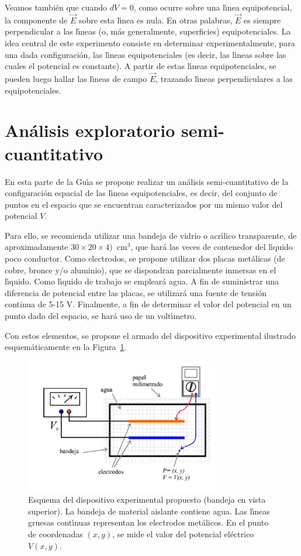 \documentclass[laboratorio]{guia}
\begin{document}
Veamos tambi\'en que cuando $dV=0$, como ocurre sobre una l\'\i nea
equipotencial, la componente de $\vec{E}$ sobre esta l\'\i nea es nula. En
otras palabras, $\vec{E}$ es siempre perpendicular a las l\'\i neas 
(o, m\'as generalmente, superficies) equipotenciales. La idea central de este
experimento consiste en determinar experimentalmente, para una dada
configuraci\'on, las l\'\i neas equipotenciales (es decir, las l\'\i neas sobre
las cuales el potencial es constante). A partir de estas l\'\i neas
equipotenciales, se pueden luego hallar las l\'\i neas de campo $\vec{E}$, 
trazando l\'\i neas perpendiculares a las equipotenciales.

\section{An\'alisis exploratorio semi-cuantitativo}

En esta parte de la Gu\'\i a se propone realizar un an\'alisis
semi-cuantitativo de la configuraci\'on espacial de las l\'\i neas
equipotenciales, es decir, del conjunto de puntos en el espacio que se
encuentran caracterizados por un mismo valor del potencial $V$.

Para ello, se recomienda utilizar una bandeja de vidrio o acr\'\i lico
transparente, de aproximadamente 
$30 \times 20 \times 4)$~cm$^3$, que har\'a las veces de contenedor del 
l\'\i quido poco conductor. Como electrodos, se propone utilizar dos placas 
met\'alicas (de cobre, bronce y/o aluminio), que se dispondran parcialmente 
inmersas en el l\'\i quido. Como l\'\i quido de trabajo se emplear\'a agua. 
A fin de suministrar una diferencia de potencial entre las placas, se 
utilizar\'a una fuente de tensi\'on continua de 5-15 V. Finalmente, a fin de
determinar el valor del potencial en un punto dado del espacio, se har\'a uso
de un volt\'\i metro.

Con estos elementos, se propone el armado del dispositivo experimental
ilustrado esquem\'aticamente en la Figura~\ref{fig:1}.

\begin{figure}[t!]
    \centering
 \includegraphics[width=8.5cm]{LG01--000.png}
\caption{Esquema del dispositivo experimental propuesto (bandeja en vista
superior). La bandeja de material aislante contiene agua. Las l\'\i neas
gruesas cont\'\i nuas representan los electrodos met\'alicos. En el punto
de coordenadas $(x,y)$, se mide el valor del potencial el\'ectrico $V(x,y)$.}
    \label{fig:1}
\end{figure}
\end{document}
